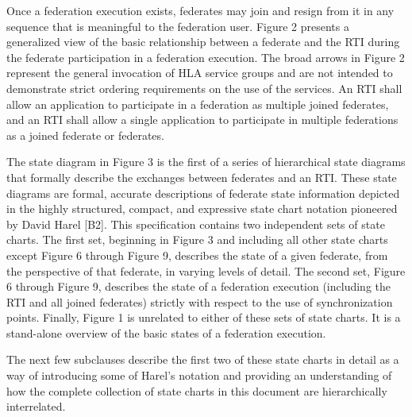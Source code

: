 \vspace*{0.75in}

\clearpage

Once a federation execution exists, federates may join and resign from it in any sequence that is meaningful to the federation user. Figure 2 presents a generalized view of the basic relationship between a federate and the RTI during the federate participation in a federation execution. The broad arrows in Figure 2 represent the general invocation of HLA service groups and are not intended to demonstrate strict ordering requirements on the use of the services. An RTI shall allow an application to participate in a federation as multiple joined federates, and an RTI shall allow a single application to participate in multiple federations as a joined federate or federates.

\vspace*{0.28in}

The state diagram in Figure 3 is the first of a series of hierarchical state diagrams that formally describe the exchanges between federates and an RTI. These state diagrams are formal, accurate descriptions of federate state information depicted in the highly structured, compact, and expressive state chart notation pioneered by David Harel [B2]. This specification contains two independent sets of state charts. The first set, beginning in Figure 3 and including all other state charts except Figure 6 through Figure 9, describes the state of a given federate, from the perspective of that federate, in varying levels of detail. The second set, Figure 6 through Figure 9, describes the state of a federation execution (including the RTI and all joined federates) strictly with respect to the use of synchronization points. Finally, Figure 1 is unrelated to either of these sets of state charts. It is a stand-alone overview of the basic states of a federation execution.

The next few subclauses describe the first two of these state charts in detail as a way of introducing some of Harel's notation and providing an understanding of how the complete collection of state charts in this document are hierarchically interrelated.

\clearpage

\vspace*{-0.09in}
\vspace*{-0.19in}

